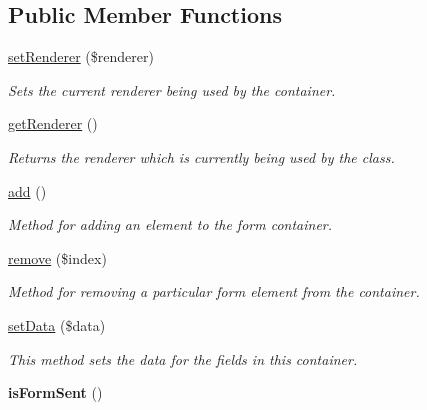 \subsection*{Public Member Functions}
\begin{DoxyCompactItemize}
\item 
\hyperlink{class_container_ac3ba7fa3e4198da7ff171f99f8dc15ba}{setRenderer} (\$renderer)
\begin{DoxyCompactList}\small\item\em Sets the current renderer being used by the container. \item\end{DoxyCompactList}\item 
\hypertarget{class_container_a8280e8e2a7c36f33338621d2fe46e2a4}{
\hyperlink{class_container_a8280e8e2a7c36f33338621d2fe46e2a4}{getRenderer} ()}
\label{class_container_a8280e8e2a7c36f33338621d2fe46e2a4}

\begin{DoxyCompactList}\small\item\em Returns the renderer which is currently being used by the class. \item\end{DoxyCompactList}\item 
\hyperlink{class_container_ad2ff3b36008336c12bd2068fce0d0eef}{add} ()
\begin{DoxyCompactList}\small\item\em Method for adding an element to the form container. \item\end{DoxyCompactList}\item 
\hyperlink{class_container_a6fcb84aedc2bf54f08f0d317e9130eec}{remove} (\$index)
\begin{DoxyCompactList}\small\item\em Method for removing a particular form element from the container. \item\end{DoxyCompactList}\item 
\hyperlink{class_container_aa075a18544dd30fe7891658635c95ee3}{setData} (\$data)
\begin{DoxyCompactList}\small\item\em This method sets the data for the fields in this container. \item\end{DoxyCompactList}\item 
\hypertarget{class_container_ae4ddd5591e7972439484909a05a62394}{
{\bfseries isFormSent} ()}
\label{class_container_ae4ddd5591e7972439484909a05a62394}


\end{DoxyCompactItemize}
